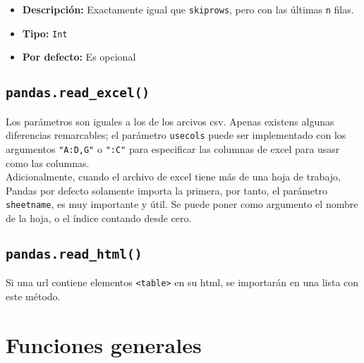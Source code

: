                     \begin{itemize}
                        \item \textbf{Descripción:} Exactamente igual que \texttt{skiprows}, pero con las últimas \texttt{n} filas.
                        \item \textbf{Tipo:} \texttt{Int}
                        \item \textbf{Por defecto:} Es opcional
                    \end{itemize}
        


        
        \subsection{\texttt{pandas.read\_excel()}}
        
        Los parámetros son iguales a los de los arcivos csv. Apenas existens algunas diferencias remarcables; el parámetro \texttt{usecols} puede ser implementado con los argumentos \texttt{"A:D,G"} o \texttt{":C"} para especificar las columnas de excel para usasr como las columnas. \\
        
        Adicionalmente, cuando el archivo de excel tiene más de una hoja de trabajo, Pandas por defecto solamente importa la primera, por tanto, el parámetro \texttt{sheetname}, es muy importante y útil. Se puede poner como argumento el nombre de la hoja, o el índice contando desde cero.

        \subsection{\texttt{pandas.read\_html()}}
                Si una url contiene elementos \texttt{<table>} en su html, se importarán en una lista con este método. 
        \section{Funciones generales}

